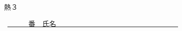 \documentclass[a4paper,9pt]{jsarticle}
\begin{document}
\hakosyokika
\begin{center}
{\Large 熱３}
\end{center}
\hfill ~\underline{~~~~~~番　氏名~~~~~~~~~~~~~~~~~~~~~~~~~~~~~~~~~~~}
\hakosyokika

\begin{enumerate}
%     
%     
%     
%     
%     
%     
%     
%     
%     
%     
%     
%     
%     
    
\newpage
    
\newpage
    
\newpage
    
\newpage

\vfill
\end{enumerate}
\end{document}
